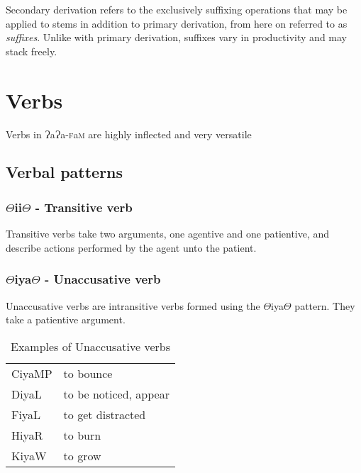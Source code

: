 \documentclass[a4paper,10pt,twoside,openright]{memoir}
\newcommand{\lang}{{\bigglot}a{\bigglot}a-\textsc{f}a\textsc{m}}
\newcommand{\rootpart}{$\Theta$}
\newcommand{\bigglot}{Ɂ}
\newcommand\famword[1]{{\addfontfeatures{Letters=UppercaseSmallCaps}#1}}
\begin{document}
Secondary derivation refers to the exclusively suffixing operations that may be applied to stems in addition to primary derivation, from here on referred to as \textit{suffixes}. Unlike with primary derivation, suffixes vary in productivity and may stack freely.


\chapter{Verbs}

Verbs in \lang{} are highly inflected and very versatile

\section{Verbal patterns}


\subsection{\rootpart{}ii\rootpart{} - Transitive verb}

Transitive verbs take two arguments, one agentive and one patientive, and describe actions performed by the agent unto the patient. 

\subsection{\rootpart{}iya\rootpart{} - Unaccusative verb}

Unaccusative verbs are intransitive verbs formed using the \rootpart{}iya\rootpart{} pattern. They take a patientive argument.

\begin{table}[ht]
    \centering
    \begin{tabular}{ll}
        \famword{CiyaMP} & to bounce \\
        \famword{DiyaL} & to be noticed, appear \\
        \famword{FiyaL} & to get distracted \\
        \famword{HiyaR} & to burn \\
        \famword{KiyaW} & to grow \\
    \end{tabular}
    \caption{Examples of Unaccusative verbs}
\end{table}
\end{document}
